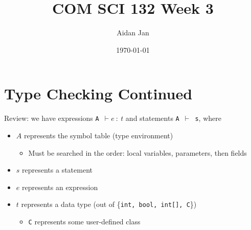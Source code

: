 \documentclass[10pt]{article}
\title{COM SCI 132 Week 3}
\author{Aidan Jan}
\date{\today}
\begin{document}
\maketitle
\section*{Type Checking Continued}
Review: we have expressions \texttt{A $\vdash e \::\: t$} and statements \texttt{A $\vdash$ s}, where
\begin{itemize}
    \item $A$ represents the symbol table (type environment)
    \begin{itemize}
        \item Must be searched in the order: local variables, parameters, then fields
    \end{itemize}
    \item $s$ represents a statement
    \item $e$ represents an expression
    \item $t$ represents a data type (out of \{\texttt{int, bool, int[], C}\})
    \begin{itemize}
        \item \texttt{C} represents some user-defined class
    \end{itemize}
\end{itemize}
\end{document}
